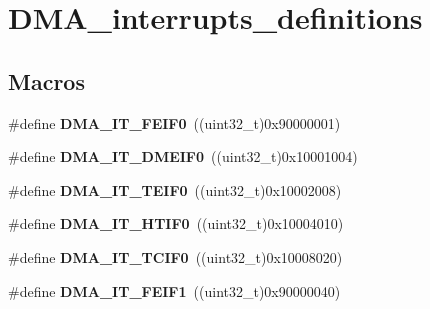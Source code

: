 \hypertarget{group___d_m_a__interrupts__definitions}{\section{D\-M\-A\-\_\-interrupts\-\_\-definitions}
\label{group___d_m_a__interrupts__definitions}
}
\subsection*{Macros}
\begin{DoxyCompactItemize}
\item 
\hypertarget{group___d_m_a__interrupts__definitions_ga5202cf7ab467fe1a61c725d1f98f0689}{\#define {\bfseries D\-M\-A\-\_\-\-I\-T\-\_\-\-F\-E\-I\-F0}~((uint32\-\_\-t)0x90000001)}\label{group___d_m_a__interrupts__definitions_ga5202cf7ab467fe1a61c725d1f98f0689}

\item 
\hypertarget{group___d_m_a__interrupts__definitions_ga8427aa66491c87a653f94f812b31cb17}{\#define {\bfseries D\-M\-A\-\_\-\-I\-T\-\_\-\-D\-M\-E\-I\-F0}~((uint32\-\_\-t)0x10001004)}\label{group___d_m_a__interrupts__definitions_ga8427aa66491c87a653f94f812b31cb17}

\item 
\hypertarget{group___d_m_a__interrupts__definitions_ga7f47bb08f22556f9a655adbce3d6982a}{\#define {\bfseries D\-M\-A\-\_\-\-I\-T\-\_\-\-T\-E\-I\-F0}~((uint32\-\_\-t)0x10002008)}\label{group___d_m_a__interrupts__definitions_ga7f47bb08f22556f9a655adbce3d6982a}

\item 
\hypertarget{group___d_m_a__interrupts__definitions_gaabb2f6093a51f4f25ac67a21125a8bc2}{\#define {\bfseries D\-M\-A\-\_\-\-I\-T\-\_\-\-H\-T\-I\-F0}~((uint32\-\_\-t)0x10004010)}\label{group___d_m_a__interrupts__definitions_gaabb2f6093a51f4f25ac67a21125a8bc2}

\item 
\hypertarget{group___d_m_a__interrupts__definitions_ga9de4a37c4fb35a2d3566d8060a8145be}{\#define {\bfseries D\-M\-A\-\_\-\-I\-T\-\_\-\-T\-C\-I\-F0}~((uint32\-\_\-t)0x10008020)}\label{group___d_m_a__interrupts__definitions_ga9de4a37c4fb35a2d3566d8060a8145be}

\item 
\hypertarget{group___d_m_a__interrupts__definitions_gaa93c3fc1826e8bf9063ab64734277ca3}{\#define {\bfseries D\-M\-A\-\_\-\-I\-T\-\_\-\-F\-E\-I\-F1}~((uint32\-\_\-t)0x90000040)}\label{group___d_m_a__interrupts__definitions_gaa93c3fc1826e8bf9063ab64734277ca3}


\end{DoxyCompactItemize}
